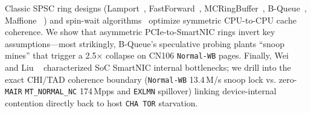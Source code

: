 Classic SPSC ring designs (Lamport~\cite{lamport1977concurrent,lamport1983specifying}, FastForward~\cite{giacomoni2008fastforward}, MCRingBuffer~\cite{lee2010mcringbuffer}, B-Queue~\cite{wang2013bqueue}, Maffione \etal{}~\cite{maffione2019spsc}) and spin-wait algorithms~\cite{anderson1990spinlock,mellorcrummey1991mcs,karlin1991competitive} optimize symmetric CPU-to-CPU cache coherence. We show that asymmetric PCIe-to-SmartNIC rings invert key assumptions---most strikingly, B-Queue's speculative probing plants ``snoop mines'' that trigger a 2.5$\times$ collapse on CN106 \texttt{Normal-WB} pages. Finally, Wei \etal{}~\cite{wei2023smartnic} and Liu \etal{}~\cite{liu2026smartnic} characterized SoC SmartNIC internal bottlenecks; we drill into the exact CHI/TAD coherence boundary (\texttt{Normal-WB} 13.4\,M/s snoop lock vs. zero-\texttt{MAIR} \texttt{MT\_NORMAL\_NC} 174\,Mpps and \texttt{EXLMN} spillover) linking device-internal contention directly back to host \texttt{CHA TOR} starvation.
